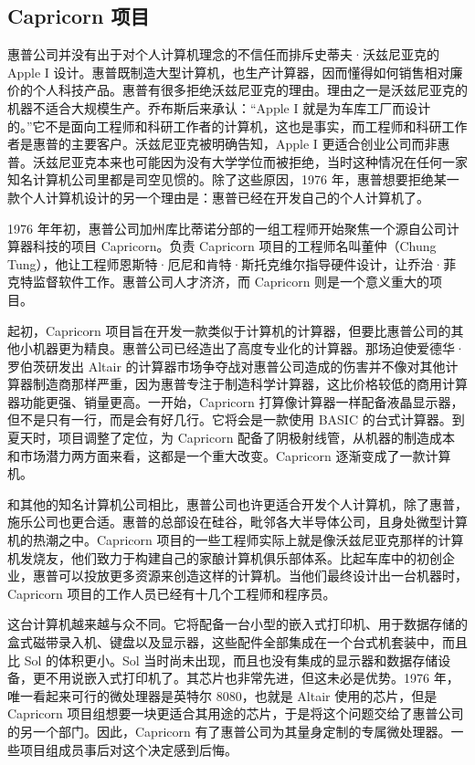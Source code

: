 \documentclass[12pt,UTF8]{ctexbook}
\begin{document}
\subsection{Capricorn 项目}


惠普公司并没有出于对个人计算机理念的不信任而排斥史蒂夫·沃兹尼亚克的 Apple I 设计。惠普既制造大型计算机，也生产计算器，因而懂得如何销售相对廉价的个人科技产品。惠普有很多拒绝沃兹尼亚克的理由。理由之一是沃兹尼亚克的机器不适合大规模生产。乔布斯后来承认：“Apple I 就是为车库工厂而设计的。”它不是面向工程师和科研工作者的计算机，这也是事实，而工程师和科研工作者是惠普的主要客户。沃兹尼亚克被明确告知，Apple I 更适合创业公司而非惠普。沃兹尼亚克本来也可能因为没有大学学位而被拒绝，当时这种情况在任何一家知名计算机公司里都是司空见惯的。除了这些原因，1976 年，惠普想要拒绝某一款个人计算机设计的另一个理由是：惠普已经在开发自己的个人计算机了。

1976 年年初，惠普公司加州库比蒂诺分部的一组工程师开始聚焦一个源自公司计算器科技的项目 Capricorn。负责 Capricorn 项目的工程师名叫董仲（Chung Tung），他让工程师恩斯特·厄尼和肯特·斯托克维尔指导硬件设计，让乔治·菲克特监督软件工作。惠普公司人才济济，而 Capricorn 则是一个意义重大的项目。

起初，Capricorn 项目旨在开发一款类似于计算机的计算器，但要比惠普公司的其他小机器更为精良。惠普公司已经造出了高度专业化的计算器。那场迫使爱德华·罗伯茨研发出 Altair 的计算器市场争夺战对惠普公司造成的伤害并不像对其他计算器制造商那样严重，因为惠普专注于制造科学计算器，这比价格较低的商用计算器功能更强、销量更高。一开始，Capricorn 打算像计算器一样配备液晶显示器，但不是只有一行，而是会有好几行。它将会是一款使用 BASIC 的台式计算器。到夏天时，项目调整了定位，为 Capricorn 配备了阴极射线管，从机器的制造成本和市场潜力两方面来看，这都是一个重大改变。Capricorn 逐渐变成了一款计算机。

和其他的知名计算机公司相比，惠普公司也许更适合开发个人计算机，除了惠普，施乐公司也更合适。惠普的总部设在硅谷，毗邻各大半导体公司，且身处微型计算机的热潮之中。Capricorn 项目的一些工程师实际上就是像沃兹尼亚克那样的计算机发烧友，他们致力于构建自己的家酿计算机俱乐部体系。比起车库中的初创企业，惠普可以投放更多资源来创造这样的计算机。当他们最终设计出一台机器时，Capricorn 项目的工作人员已经有十几个工程师和程序员。

这台计算机越来越与众不同。它将配备一台小型的嵌入式打印机、用于数据存储的盒式磁带录入机、键盘以及显示器，这些配件全部集成在一个台式机套装中，而且比 Sol 的体积更小。Sol 当时尚未出现，而且也没有集成的显示器和数据存储设备，更不用说嵌入式打印机了。其芯片也非常先进，但这未必是优势。1976 年，唯一看起来可行的微处理器是英特尔 8080，也就是 Altair 使用的芯片，但是 Capricorn 项目组想要一块更适合其用途的芯片，于是将这个问题交给了惠普公司的另一个部门。因此，Capricorn 有了惠普公司为其量身定制的专属微处理器。一些项目组成员事后对这个决定感到后悔。
\end{document}
